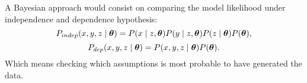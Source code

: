 A Bayesian approach would consist on comparing the model likelihood under independence and dependence hypothesis:
\[
  P_{indep}(x,y,z \mid \bm{\theta}) = P(x\mid z, \bm{\theta})P(y \mid z, \bm{\theta})P(z \mid \bm{\theta})P(\bm{\theta}),
\]
\[
P_{dep}(x,y,z \mid \bm{\theta}) = P(x,y,z \mid \bm{\theta})P(\bm{\theta}).
\]
Which means checking which assumptions is most probable to have generated the data.
